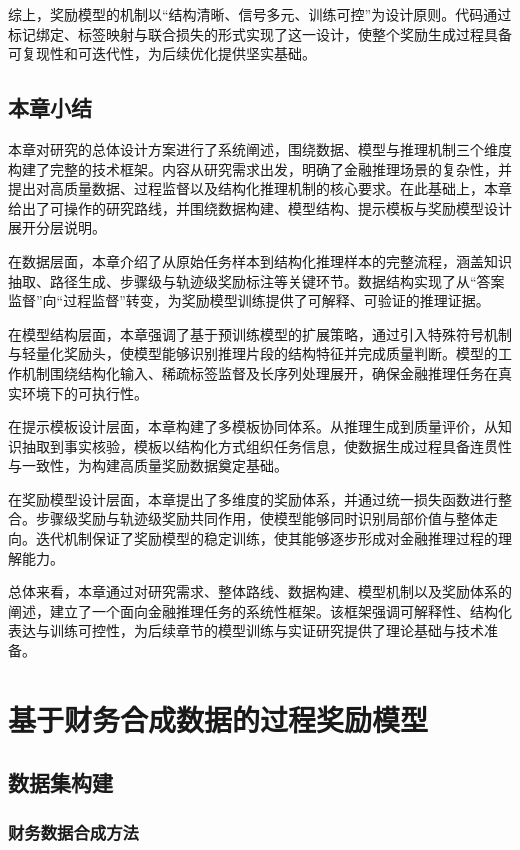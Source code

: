 \documentclass[professional,privacy,print,win,long,STEM,AutoFakeBold]{def/buaa}
\begin{document}
综上，奖励模型的机制以“结构清晰、信号多元、训练可控”为设计原则。代码通过标记绑定、标签映射与联合损失的形式实现了这一设计，使整个奖励生成过程具备可复现性和可迭代性，为后续优化提供坚实基础。

\section{本章小结}

本章对研究的总体设计方案进行了系统阐述，围绕数据、模型与推理机制三个维度构建了完整的技术框架。内容从研究需求出发，明确了金融推理场景的复杂性，并提出对高质量数据、过程监督以及结构化推理机制的核心要求。在此基础上，本章给出了可操作的研究路线，并围绕数据构建、模型结构、提示模板与奖励模型设计展开分层说明。

在数据层面，本章介绍了从原始任务样本到结构化推理样本的完整流程，涵盖知识抽取、路径生成、步骤级与轨迹级奖励标注等关键环节。数据结构实现了从“答案监督”向“过程监督”转变，为奖励模型训练提供了可解释、可验证的推理证据。

在模型结构层面，本章强调了基于预训练模型的扩展策略，通过引入特殊符号机制与轻量化奖励头，使模型能够识别推理片段的结构特征并完成质量判断。模型的工作机制围绕结构化输入、稀疏标签监督及长序列处理展开，确保金融推理任务在真实环境下的可执行性。

在提示模板设计层面，本章构建了多模板协同体系。从推理生成到质量评价，从知识抽取到事实核验，模板以结构化方式组织任务信息，使数据生成过程具备连贯性与一致性，为构建高质量奖励数据奠定基础。

在奖励模型设计层面，本章提出了多维度的奖励体系，并通过统一损失函数进行整合。步骤级奖励与轨迹级奖励共同作用，使模型能够同时识别局部价值与整体走向。迭代机制保证了奖励模型的稳定训练，使其能够逐步形成对金融推理过程的理解能力。

总体来看，本章通过对研究需求、整体路线、数据构建、模型机制以及奖励体系的阐述，建立了一个面向金融推理任务的系统性框架。该框架强调可解释性、结构化表达与训练可控性，为后续章节的模型训练与实证研究提供了理论基础与技术准备。



\newpage
\chapter{基于财务合成数据的过程奖励模型}
\section{数据集构建}
\subsection{财务数据合成方法}
\end{document}
